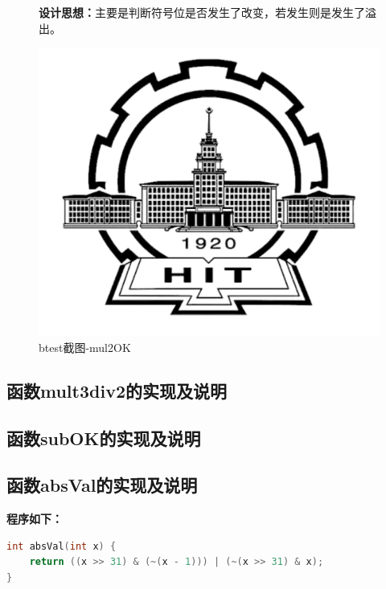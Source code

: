 \begin{figure}[H]
\begin{minipage}[c]{0.5\linewidth}
\textbf{设计思想：}主要是判断符号位是否发生了改变，若发生则是发生了溢出。
\end{minipage}
\begin{minipage}[c]{0.4\linewidth}
\centering
\includegraphics[width=0.9\linewidth]{figures/HIT}
\caption{btest截图-mul2OK}
\label{fig:mul2OK}
\end{minipage}
\end{figure}

\subsection{函数mult3div2的实现及说明}
\subsection{函数subOK的实现及说明}
\subsection{函数absVal的实现及说明}
\textbf{程序如下：}

\begin{lstlisting}[language = c]
int absVal(int x) {
	return ((x >> 31) & (~(x - 1))) | (~(x >> 31) & x);
}
\end{lstlisting}

